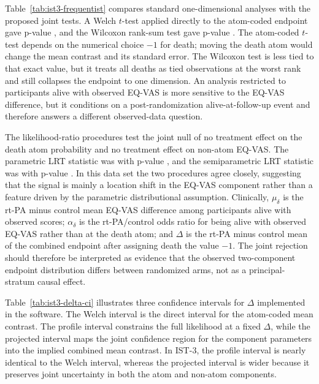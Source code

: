 \documentclass[11pt]{article}
\begin{document}
Table~\ref{tab:ist3-frequentist} compares standard one-dimensional analyses with the proposed joint tests. A Welch $t$-test applied directly to the atom-coded endpoint gave p-value \ApplicationTTestP{}, and the Wilcoxon rank-sum test gave p-value \ApplicationWilcoxP{}. The atom-coded $t$-test depends on the numerical choice $-1$ for death; moving the death atom would change the mean contrast and its standard error. The Wilcoxon test is less tied to that exact value, but it treats all deaths as tied observations at the worst rank and still collapses the endpoint to one dimension. An analysis restricted to participants alive with observed EQ-VAS is more sensitive to the EQ-VAS difference, but it conditions on a post-randomization alive-at-follow-up event and therefore answers a different observed-data question.



The likelihood-ratio procedures test the joint null of no treatment effect on the death atom probability and no treatment effect on non-atom EQ-VAS. The parametric LRT statistic was \ApplicationLRTStatistic{} with p-value \ApplicationLRTP{}, and the semiparametric LRT statistic was \ApplicationSPLRTStatistic{} with p-value \ApplicationSPLRTP{}. In this data set the two procedures agree closely, suggesting that the signal is mainly a location shift in the EQ-VAS component rather than a feature driven by the parametric distributional assumption. Clinically, $\mu_\delta$ is the rt-PA minus control mean EQ-VAS difference among participants alive with observed scores; $\alpha_\delta$ is the rt-PA/control odds ratio for being alive with observed EQ-VAS rather than at the death atom; and $\Delta$ is the rt-PA minus control mean of the combined endpoint after assigning death the value $-1$. The joint rejection should therefore be interpreted as evidence that the observed two-component endpoint distribution differs between randomized arms, not as a principal-stratum causal effect.



Table~\ref{tab:ist3-delta-ci} illustrates three confidence intervals for $\Delta$ implemented in the software. The Welch interval is the direct interval for the atom-coded mean contrast. The profile interval constrains the full likelihood at a fixed $\Delta$, while the projected interval maps the joint confidence region for the component parameters into the implied combined mean contrast. In IST-3, the profile interval is nearly identical to the Welch interval, whereas the projected interval is wider because it preserves joint uncertainty in both the atom and non-atom components.
\end{document}
